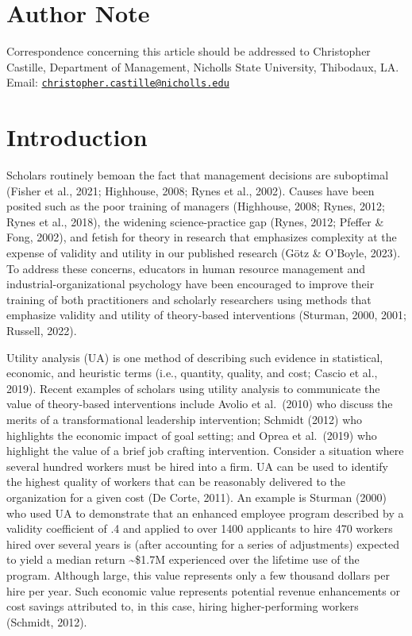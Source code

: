 \documentclass[
]{article}
\begin{document}
\section{Author Note}\label{author-note}

Correspondence concerning this article should be addressed to
Christopher Castille, Department of Management, Nicholls State
University, Thibodaux, LA. Email:
\href{mailto:christopher.castille@nicholls.edu}{\nolinkurl{christopher.castille@nicholls.edu}}

\setcounter{page}{2}

\section{Introduction}\label{introduction}

Scholars routinely bemoan the fact that management decisions are
suboptimal (Fisher et al., 2021; Highhouse, 2008; Rynes et al., 2002).
Causes have been posited such as the poor training of managers
(Highhouse, 2008; Rynes, 2012; Rynes et al., 2018), the widening
science-practice gap (Rynes, 2012; Pfeffer \& Fong, 2002), and fetish
for theory in research that emphasizes complexity at the expense of
validity and utility in our published research (Götz \& O'Boyle, 2023).
To address these concerns, educators in human resource management and
industrial-organizational psychology have been encouraged to improve
their training of both practitioners and scholarly researchers using
methods that emphasize validity and utility of theory-based
interventions (Sturman, 2000, 2001; Russell, 2022).

Utility analysis (UA) is one method of describing such evidence in
statistical, economic, and heuristic terms (i.e., quantity, quality, and
cost; Cascio et al., 2019). Recent examples of scholars using utility
analysis to communicate the value of theory-based interventions include
Avolio et al.~(2010) who discuss the merits of a transformational
leadership intervention; Schmidt (2012) who highlights the economic
impact of goal setting; and Oprea et al.~(2019) who highlight the value
of a brief job crafting intervention. Consider a situation where several
hundred workers must be hired into a firm. UA can be used to identify
the highest quality of workers that can be reasonably delivered to the
organization for a given cost (De Corte, 2011). An example is Sturman
(2000) who used UA to demonstrate that an enhanced employee program
described by a validity coefficient of .4 and applied to over 1400
applicants to hire 470 workers hired over several years is (after
accounting for a series of adjustments) expected to yield a median
return \textasciitilde\$1.7M experienced over the lifetime use of the
program. Although large, this value represents only a few thousand
dollars per hire per year. Such economic value represents potential
revenue enhancements or cost savings attributed to, in this case, hiring
higher-performing workers (Schmidt, 2012).
\end{document}
